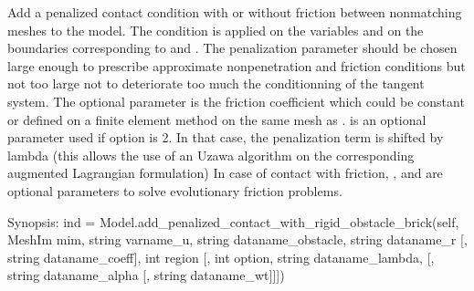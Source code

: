 \documentclass[a4paper,11pt,english]{sphinxmanual}
\begin{document}
\begin{fulllineitems}
\begin{fulllineitems}
Add a penalized contact condition with or without friction between
nonmatching meshes to the model.
The condition is applied on the variables  and  
on the boundaries corresponding to  and .
The penalization parameter  should be chosen
large enough to prescribe approximate non\sphinxhyphen{}penetration and friction
conditions but not too large not to deteriorate too much the
conditionning of the tangent system.
The optional parameter  is the friction
coefficient which could be constant or defined on a finite element
method on the same mesh as .
 is an optional parameter used if option
is 2. In that case, the penalization term is shifted by lambda (this
allows the use of an Uzawa algorithm on the corresponding augmented
Lagrangian formulation)
In case of contact with friction, ,  and
 are optional parameters to solve evolutionary friction
problems.

\end{fulllineitems}


\begin{fulllineitems}
\label{\detokenize{python/cmdref_Model:getfem.Model.add_penalized_contact_with_rigid_obstacle_brick}}
Synopsis: ind = Model.add\_penalized\_contact\_with\_rigid\_obstacle\_brick(self,  MeshIm mim, string varname\_u, string dataname\_obstacle, string dataname\_r {[}, string dataname\_coeff{]}, int region {[}, int option, string dataname\_lambda, {[}, string dataname\_alpha {[}, string dataname\_wt{]}{]}{]})


\end{fulllineitems}
\end{fulllineitems}
\end{document}
